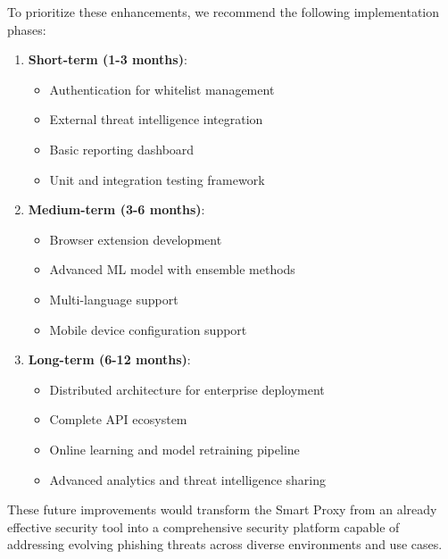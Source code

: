 To prioritize these enhancements, we recommend the following implementation phases:

\begin{enumerate}
    \item \textbf{Short-term (1-3 months)}:
    \begin{itemize}
        \item Authentication for whitelist management
        \item External threat intelligence integration
        \item Basic reporting dashboard
        \item Unit and integration testing framework
    \end{itemize}
    
    \item \textbf{Medium-term (3-6 months)}:
    \begin{itemize}
        \item Browser extension development
        \item Advanced ML model with ensemble methods
        \item Multi-language support
        \item Mobile device configuration support
    \end{itemize}
    
    \item \textbf{Long-term (6-12 months)}:
    \begin{itemize}
        \item Distributed architecture for enterprise deployment
        \item Complete API ecosystem
        \item Online learning and model retraining pipeline
        \item Advanced analytics and threat intelligence sharing
    \end{itemize}
\end{enumerate}

These future improvements would transform the Smart Proxy from an already effective security tool into a comprehensive security platform capable of addressing evolving phishing threats across diverse environments and use cases.
